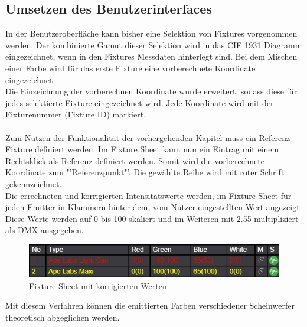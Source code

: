 \documentclass[11pt]{scrartcl}
\begin{document}
\subsection{Umsetzen des Benutzerinterfaces}
In der Benutzeroberfläche kann bisher eine Selektion von Fixtures vorgenommen werden. Der kombinierte Gamut dieser Selektion wird in das CIE 1931 Diagramm
eingezeichnet, wenn in den Fixtures Messdaten hinterlegt sind. Bei dem Mischen einer Farbe wird für das erste Fixture eine vorberechnete Koordinate
eingezeichnet.\\
Die Einzeichnung der vorberechnen Koordinate wurde erweitert, sodass diese für jedes selektierte Fixture eingezeichnet wird. Jede Koordinate wird mit
der Fixturenummer (Fixture ID) markiert.\\
\\
Zum Nutzen der Funktionalität der vorhergehenden Kapitel muss ein Referenz-Fixture definiert werden. Im Fixture Sheet kann nun ein Eintrag mit
einem Rechtsklick als Referenz definiert werden. Somit wird die vorberechnete Koordinate zum "'Referenzpunkt"'. Die gewählte Reihe wird mit roter
Schrift gekennzeichnet.\\
Die errechneten und korrigierten Intensitätswerte werden, im Fixture Sheet für jeden Emitter in Klammern hinter dem, vom Nutzer eingestellten Wert angezeigt. Diese
Werte werden auf 0 bis 100 skaliert und im Weiteren mit 2.55 multipliziert als DMX ausgegeben.
\begin{figure}[H]
    \begin{center}
        \includegraphics[width=.8\textwidth]{images/app_fixture_sheet_with_reference.png} %
    \end{center}
    \caption{Fixture Sheet mit korrigierten Werten}
\end{figure}
\noindent
Mit diesem Verfahren können die emittierten Farben verschiedener Scheinwerfer theoretisch abgeglichen werden.
\clearpage

\end{document}
